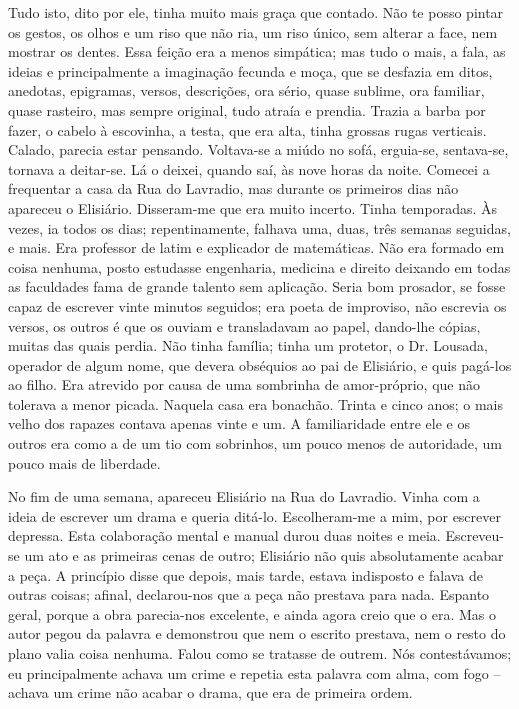 Tudo isto, dito por ele, tinha muito mais graça que contado. Não te
posso pintar os gestos, os olhos e um riso que não ria, um riso único,
sem alterar a face, nem mostrar os dentes. Essa feição era a menos
simpática; mas tudo o mais, a fala, as ideias e principalmente a
imaginação fecunda e moça, que se desfazia em ditos, anedotas,
epigramas, versos, descrições, ora sério, quase sublime, ora familiar,
quase rasteiro, mas sempre original, tudo atraía e prendia. Trazia a
barba por fazer, o cabelo à escovinha, a testa, que era alta, tinha
grossas rugas verticais. Calado, parecia estar pensando. Voltava-se a
miúdo no sofá, erguia-se, sentava-se, tornava a deitar-se. Lá o deixei,
quando saí, às nove horas da noite. Comecei a frequentar a casa da Rua
do Lavradio, mas durante os primeiros dias não apareceu o Elisiário.
Disseram-me que era muito incerto. Tinha temporadas. Às vezes, ia todos
os dias; repentinamente, falhava uma, duas, três semanas seguidas, e
mais. Era professor de latim e explicador de matemáticas. Não era
formado em coisa nenhuma, posto estudasse engenharia, medicina e direito
deixando em todas as faculdades fama de grande talento sem aplicação.
Seria bom prosador, se fosse capaz de escrever vinte minutos seguidos;
era poeta de improviso, não escrevia os versos, os outros é que os
ouviam e transladavam ao papel, dando-lhe cópias, muitas das quais
perdia. Não tinha família; tinha um protetor, o Dr. Lousada, operador de
algum nome, que devera obséquios ao pai de Elisiário, e quis pagá-los ao
filho. Era atrevido por causa de uma sombrinha de amor-próprio, que não
tolerava a menor picada. Naquela casa era bonachão. Trinta e cinco anos;
o mais velho dos rapazes contava apenas vinte e um. A familiaridade
entre ele e os outros era como a de um tio com sobrinhos, um pouco menos
de autoridade, um pouco mais de liberdade.

No fim de uma semana, apareceu Elisiário na Rua do Lavradio. Vinha com a
ideia de escrever um drama e queria ditá-lo. Escolheram-me a mim, por
escrever depressa. Esta colaboração mental e manual durou duas noites e
meia. Escreveu-se um ato e as primeiras cenas de outro; Elisiário não
quis absolutamente acabar a peça. A princípio disse que depois, mais
tarde, estava indisposto e falava de outras coisas; afinal, declarou-nos
que a peça não prestava para nada. Espanto geral, porque a obra
parecia-nos excelente, e ainda agora creio que o era. Mas o autor pegou
da palavra e demonstrou que nem o escrito prestava, nem o resto do plano
valia coisa nenhuma. Falou como se tratasse de outrem. Nós
contestávamos; eu principalmente achava um crime e repetia esta palavra
com alma, com fogo -- achava um crime não acabar o drama, que era de
primeira ordem.

